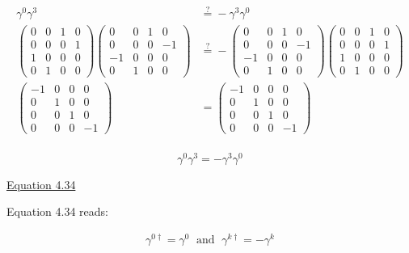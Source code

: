 \documentclass[11pt]{article}
\theoremstyle{definition}
\begin{document}
\begin{align}
    \gamma^{0}\gamma^{3} &\stackrel{?}{=} -\gamma^{3}\gamma^{0}\\
    \begin{pmatrix}0&0&1&0\\      0&0&0&1\\      1&0&0&0\\      0&1&0&0\end{pmatrix}\begin{pmatrix}0&0&1&0\\      0&0&0&-1\\      -1&0&0&0\\      0&1&0&0\end{pmatrix} &\stackrel{?}{=}-\begin{pmatrix}0&0&1&0\\        0&0&0&-1\\       -1&0&0&0\\        0&1&0&0\end{pmatrix}\begin{pmatrix}0&0&1&0\\        0&0&0&1\\        1&0&0&0\\        0&1&0&0\end{pmatrix}\\
    \begin{pmatrix}-1&0&0&0\\ 0&1&0&0\\ 0&0&1&0\\ 0&0&0&-1\end{pmatrix} &= \begin{pmatrix}-1&0&0&0\\ 0&1&0&0\\ 0&0&1&0\\ 0&0&0&-1\end{pmatrix}\\
\end{align}

\begin{equation}
\boxed{
    \gamma^{0}\gamma^{3} = -\gamma^{3}\gamma^{0}
}
\end{equation}

\underline{Equation 4.34}

Equation 4.34 reads:

\begin{align*}
    \gamma^{0\dagger} = \gamma^{0}\;
    \text{ and }
    \; \gamma^{k\dagger} = -\gamma^{k}
    \tag*{(4.34)}
\end{align*}
\end{document}

